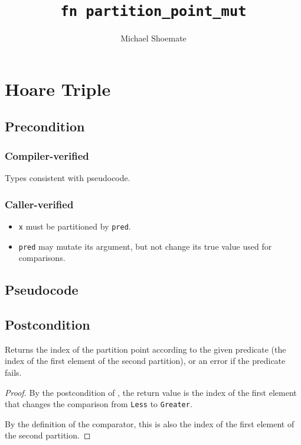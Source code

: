 \documentclass{article}
\title{\texttt{fn partition\_point\_mut}}
\author{Michael Shoemate}
\begin{document}
  
\maketitle 
 
\section{Hoare Triple} 
\subsection*{Precondition} 
\subsubsection*{Compiler-verified}
Types consistent with pseudocode.

\subsubsection*{Caller-verified}
\begin{itemize}
    \item \texttt{x} must be partitioned by \texttt{pred}.
    \item \texttt{pred} may mutate its argument, but not change its true value used for comparisons.
\end{itemize}

\subsection*{Pseudocode} 
\label{sec:python-pseudocode} 
 
 
\subsection*{Postcondition} 

\begin{theorem}
    Returns the index of the partition point according to the given predicate (the index of the first element of the second partition),
    or an error if the predicate fails.
\end{theorem}

\begin{proof}
    By the postcondition of ,
    the return value is the index of the first element that changes the comparison from \texttt{Less} to \texttt{Greater}.

    By the definition of the comparator, this is also the index of the first element of the second partition.
\end{proof}
\end{document}
